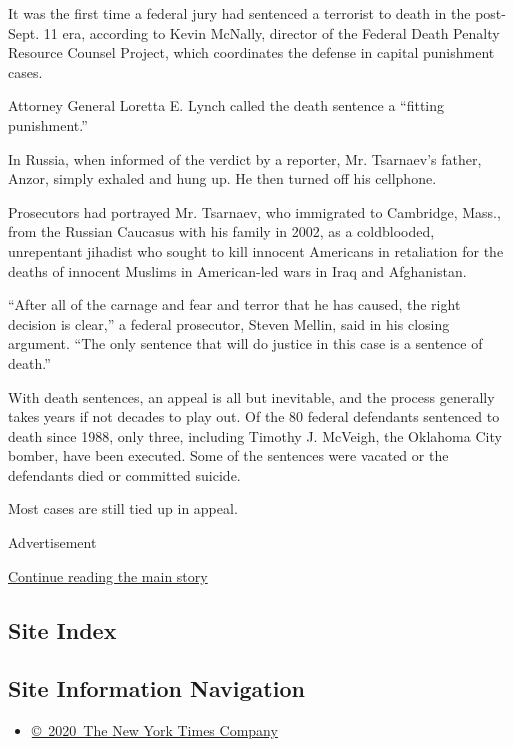 It was the first time a federal jury had sentenced a terrorist to death
in the post-Sept. 11 era, according to Kevin McNally, director of the
Federal Death Penalty Resource Counsel Project, which coordinates the
defense in capital punishment cases.

Attorney General Loretta E. Lynch called the death sentence a ``fitting
punishment.''

In Russia, when informed of the verdict by a reporter, Mr. Tsarnaev's
father, Anzor, simply exhaled and hung up. He then turned off his
cellphone.

Prosecutors had portrayed Mr. Tsarnaev, who immigrated to Cambridge,
Mass., from the Russian Caucasus with his family in 2002, as a
coldblooded, unrepentant jihadist who sought to kill innocent Americans
in retaliation for the deaths of innocent Muslims in American-led wars
in Iraq and Afghanistan.

``After all of the carnage and fear and terror that he has caused, the
right decision is clear,'' a federal prosecutor, Steven Mellin, said in
his closing argument. ``The only sentence that will do justice in this
case is a sentence of death.''

With death sentences, an appeal is all but inevitable, and the process
generally takes years if not decades to play out. Of the 80 federal
defendants sentenced to death since 1988, only three, including Timothy
J. McVeigh, the Oklahoma City bomber, have been executed. Some of the
sentences were vacated or the defendants died or committed suicide.

Most cases are still tied up in appeal.

Advertisement

\protect\hyperlink{after-bottom}{Continue reading the main story}

\hypertarget{site-index}{%
\subsection{Site Index}\label{site-index}}

\hypertarget{site-information-navigation}{%
\subsection{Site Information
Navigation}\label{site-information-navigation}}

\begin{itemize}
\tightlist
\item
  \href{https://help.nytimes.com/hc/en-us/articles/115014792127-Copyright-notice}{©~2020~The
  New York Times Company}
\end{itemize}

